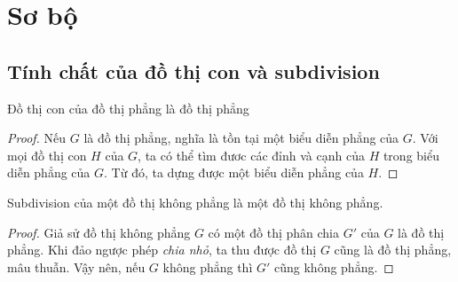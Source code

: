 \section{Sơ bộ}
\subsection{Tính chất của đồ thị con và subdivision}

\begin{corollary}
    Đồ thị con của đồ thị phẳng là đồ thị phẳng
\end{corollary}

\begin{proof}
    Nếu $G$ là đồ thị phẳng, nghĩa là tồn tại một biểu diễn phẳng của $G$. Với mọi đồ thị con
    $H$ của $G$, ta có thể tìm đươc các đỉnh và cạnh của $H$ trong biểu diễn phẳng của $G$.
    Từ đó, ta dựng được một biểu diễn phẳng của $H$.
\end{proof}


\begin{corollary}
    Subdivision của một đồ thị không phẳng là một đồ thị không phẳng.
\end{corollary}
\begin{proof}
    Giả sử đồ thị không phẳng $G$ có một đồ thị phân chia $G'$ của $G$ là đồ thị phẳng.
    Khi đảo ngược phép \textit{chia nhỏ}, ta thu được đồ thị $G$ cũng là đồ thị phẳng, mâu thuẫn.
    Vậy nên, nếu $G$ không phẳng thì $G'$ cũng không phẳng.
\end{proof}

